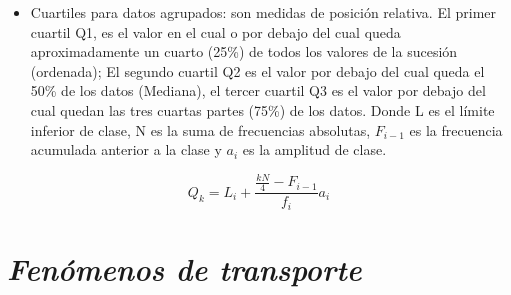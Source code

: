 \documentclass[letterpaper,12pt]{article}
\begin{document}
    \begin{itemize}
    \item [\ding{99}]
    \small{Cuartiles para datos agrupados: son medidas de posición relativa. El primer cuartil Q1, es el valor en el cual o por debajo del cual queda aproximadamente un cuarto (25\%) de todos los valores de la sucesión (ordenada); El segundo cuartil Q2 es el valor por debajo del cual queda el 50\% de los datos (Mediana), el tercer cuartil Q3 es el valor por debajo del cual quedan las tres cuartas partes (75\%) de los datos. Donde L es el límite inferior de clase, N es la suma de frecuencias absolutas, $F_{i-1}$ es la frecuencia acumulada anterior a la clase y $a_i$ es la amplitud de clase.}
    \end{itemize}
    \begin{equation*}%
    Q_k=L_i+\frac{\frac{kN}{4}-F_{i-1}}{f_i}a_i
    \end{equation*}

\section{\textit{Fenómenos de transporte}}
\end{document}
